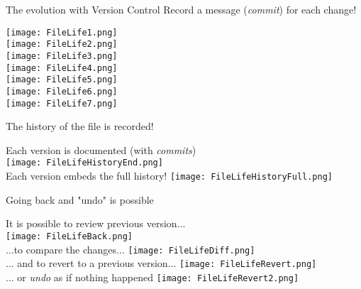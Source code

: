 \documentclass[xcolor=x11names,compress]{beamer}
\renewcommand{\(}{\begin{columns}}
\renewcommand{\)}{\end{columns}}
\newcommand{\<}[1]{\begin{column}{#1}}
\renewcommand{\>}{\end{column}}
\begin{document}
\begin{frame}{The evolution \textcolor{brique}{with Version Control}}
Record a message (\emph{commit})  for each change!
\begin{center}
\begin{itemize}
    {\texttt{[image: FileLife1.png]} \\ }
    {\texttt{[image: FileLife2.png]} \\ }
    {\texttt{[image: FileLife3.png]} \\ }
    {\texttt{[image: FileLife4.png]} \\ }
    {\texttt{[image: FileLife5.png]} \\ }
    {\texttt{[image: FileLife6.png]} \\ }
    {\texttt{[image: FileLife7.png]} \\ }
\end{itemize}
\end{center}
\end{frame}

\begin{frame}{The history of the file is recorded!}
\begin{center}
\begin{itemize}
    {Each version is documented (with \emph{commits}) \\ }
    {\texttt{[image: FileLifeHistoryEnd.png]} \\ }
    {Each version embeds the full history!  }
    {\texttt{[image: FileLifeHistoryFull.png]} \\ }
\end{itemize}
\end{center}
\end{frame}

\begin{frame}{Going back and "undo" is possible}
\begin{center}
\begin{itemize}
    {It is possible to review previous version... \\ }
    {\texttt{[image: FileLifeBack.png]} \\ }
    {...to compare the changes...  }
    {\texttt{[image: FileLifeDiff.png]} \\ }
    {... and to revert  to a  previous version... }
    {\texttt{[image: FileLifeRevert.png]} \\ }
    {... or \emph{undo} as if nothing happened }
    {\texttt{[image: FileLifeRevert2.png]} \\ }

\end{itemize}
\end{center}
\end{frame}
\end{document}
